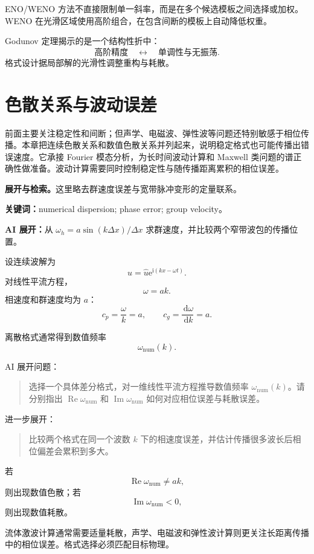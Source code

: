 \documentclass[11pt,openany]{ctexbook}
\newcommand{\dd}{\,\mathrm d}
\newcommand{\ee}{\mathrm e}
\newcommand{\ii}{\mathrm i}
\newcommand{\studyroute}[3]{%
  \par\smallskip\noindent\textbf{展开与检索。}#1\par
  \noindent\textbf{关键词：}#2。\par
  \noindent\textbf{AI 展开：}#3\par
}
\begin{document}
ENO/WENO 方法不直接限制单一斜率，而是在多个候选模板之间选择或加权。WENO 在光滑区域使用高阶组合，在包含间断的模板上自动降低权重。

Godunov 定理揭示的是一个结构性折中：
\[
\text{高阶精度}
\quad\leftrightarrow\quad
\text{单调性与无振荡}.
\]
格式设计据局部解的光滑性调整重构与耗散。

\chapter{色散关系与波动误差}

\begin{chaptersummary}
前面主要关注稳定性和间断；但声学、电磁波、弹性波等问题还特别敏感于相位传播。本章把连续色散关系和数值色散关系并列起来，说明稳定格式也可能传播出错误速度。它承接 Fourier 模态分析，为长时间波动计算和 Maxwell 类问题的谱正确性做准备。波动计算需要同时控制稳定性与随传播距离累积的相位误差。
\end{chaptersummary}
\studyroute{这里略去群速度误差与宽带脉冲变形的定量联系。}{numerical dispersion; phase error; group velocity}{从 $\omega_h=a\sin(k\Delta x)/\Delta x$ 求群速度，并比较两个窄带波包的传播位置。}

设连续波解为
\[
u=\widehat u\ee^{\ii(kx-\omega t)}.
\]
对线性平流方程，
\[
\omega=ak.
\]
相速度和群速度均为 \(a\)：
\[
c_p=\frac{\omega}{k}=a,
\qquad
c_g=\frac{\dd\omega}{\dd k}=a.
\]

离散格式通常得到数值频率
\[
\omega_{\mathrm{num}}(k).
\]

\begin{askai}
AI 展开问题：
\begin{quote}
选择一个具体差分格式，对一维线性平流方程推导数值频率 \(\omega_{\mathrm{num}}(k)\)。请分别指出 \(\operatorname{Re}\omega_{\mathrm{num}}\) 和 \(\operatorname{Im}\omega_{\mathrm{num}}\) 如何对应相位误差与耗散误差。
\end{quote}

进一步展开：
\begin{quote}
比较两个格式在同一个波数 \(k\) 下的相速度误差，并估计传播很多波长后相位偏差会累积到多大。
\end{quote}
\end{askai}

若
\[
\operatorname{Re}\omega_{\mathrm{num}}\neq ak,
\]
则出现数值色散；若
\[
\operatorname{Im}\omega_{\mathrm{num}}<0,
\]
则出现数值耗散。

流体激波计算通常需要适量耗散，声学、电磁波和弹性波计算则更关注长距离传播中的相位误差。格式选择必须匹配目标物理。
\end{document}
